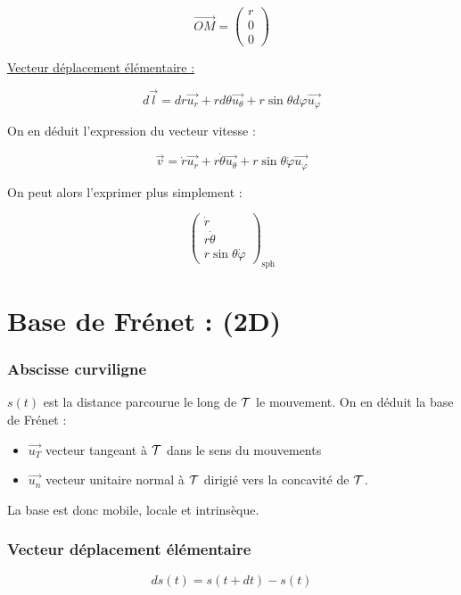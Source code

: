 \documentclass{article}
\begin{document}
$$
\boxed{\overrightarrow{OM}=\left(\begin{array}{c}r\\0\\0\end{array}\right)}
$$

\underline{Vecteur déplacement élémentaire :}

$$
d\overrightarrow{l}=dr\overrightarrow{u_r}+rd\theta\overrightarrow{u_\theta}+r\sin\theta d\varphi\overrightarrow{u_\varphi}
$$

On en déduit l'expression du vecteur vitesse :

$$
\boxed{\overrightarrow{v}=\dot{r}\overrightarrow{u_r}+r\dot{\theta}\overrightarrow{u_\theta}+r\sin\theta\dot{\varphi}\overrightarrow{u_\varphi}}
$$

On peut alors l'exprimer plus simplement :

$$\left(\begin{array}{c}\dot{r}\\r\dot{\theta}\\r\sin\theta\dot{\varphi}\end{array}\right)_\text{sph}$$

\section{Base de Frénet : (2D)}

\subsubsection*{Abscisse curviligne}

$s(t)$ est la distance parcourue le long de $\mathcal{T}$ le mouvement. On en déduit la base de Frénet :

\begin{itemize}
    \item $\overrightarrow{u_T}$ vecteur tangeant à $\mathcal{T}$ dans le sens du mouvements
    \item $\overrightarrow{u_n}$ vecteur unitaire normal à $\mathcal{T}$ dirigié vers la concavité de $\mathcal{T}$.
\end{itemize}

La base est donc mobile, locale et intrinsèque.

\subsubsection*{Vecteur déplacement élémentaire}

$$ds(t) = s(t+dt)-s(t)$$
\end{document}
